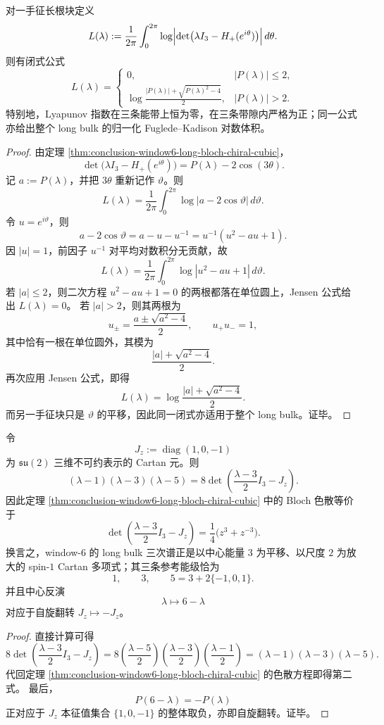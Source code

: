 \begin{theorem}\label{thm:conclusion-window6-long-bloch-lyapunov-fk}
对一手征长根块定义
\[
L(\lambda):=
\frac{1}{2\pi}
\int_0^{2\pi}
\log\Bigl|\det\bigl(\lambda I_3-H_+(e^{i\theta})\bigr)\Bigr|\,d\theta.
\]
则有闭式公式
\[
L(\lambda)=
\begin{cases}
0, & |P(\lambda)|\le 2,\\[2mm]
\displaystyle
\log\frac{|P(\lambda)|+\sqrt{P(\lambda)^2-4}}{2},
& |P(\lambda)|>2.
\end{cases}
\]
特别地，Lyapunov 指数在三条能带上恒为零，在三条带隙内严格为正；同一公式亦给出整个 long bulk 的归一化 Fuglede--Kadison 对数体积。
\end{theorem}
\begin{proof}
由定理 \ref{thm:conclusion-window6-long-bloch-chiral-cubic}，
\[
\det\bigl(\lambda I_3-H_+(e^{i\theta})\bigr)=P(\lambda)-2\cos(3\theta).
\]
记 \(a:=P(\lambda)\)，并把 \(3\theta\) 重新记作 \(\vartheta\)。则
\[
L(\lambda)=\frac1{2\pi}\int_0^{2\pi}\log|a-2\cos\vartheta|\,d\vartheta.
\]
令 \(u=e^{i\vartheta}\)，则
\[
a-2\cos\vartheta=a-u-u^{-1}=u^{-1}(u^2-au+1).
\]
因 \(|u|=1\)，前因子 \(u^{-1}\) 对平均对数积分无贡献，故
\[
L(\lambda)=\frac1{2\pi}\int_0^{2\pi}\log|u^2-au+1|\,d\vartheta.
\]
若 \(|a|\le 2\)，则二次方程 \(u^2-au+1=0\) 的两根都落在单位圆上，Jensen 公式给出 \(L(\lambda)=0\)。
若 \(|a|>2\)，则其两根为
\[
u_{\pm}=\frac{a\pm \sqrt{a^2-4}}{2},
\qquad
u_+u_-=1,
\]
其中恰有一根在单位圆外，其模为
\[
\frac{|a|+\sqrt{a^2-4}}{2}.
\]
再次应用 Jensen 公式，即得
\[
L(\lambda)=\log\frac{|a|+\sqrt{a^2-4}}{2}.
\]
而另一手征块只是 \(\vartheta\) 的平移，因此同一闭式亦适用于整个 long bulk。证毕。
\end{proof}

\begin{proposition}\label{prop:conclusion-window6-spin1-cartan-shadow}
令
\[
J_z:=\operatorname{diag}(1,0,-1)
\]
为 \(\mathfrak{su}(2)\) 三维不可约表示的 Cartan 元。则
\[
(\lambda-1)(\lambda-3)(\lambda-5)
=
8\det\!\left(\frac{\lambda-3}{2}I_3-J_z\right).
\]
因此定理 \ref{thm:conclusion-window6-long-bloch-chiral-cubic} 中的 Bloch 色散等价于
\[
\det\!\left(\frac{\lambda-3}{2}I_3-J_z\right)
=
\frac14\bigl(z^3+z^{-3}\bigr).
\]
换言之，window-\(6\) 的 long bulk 三次谱正是以中心能量 \(3\) 为平移、以尺度 \(2\) 为放大的 spin-\(1\) Cartan 多项式；其三条参考能级恰为
\[
1,\qquad 3,\qquad 5=3+2\{-1,0,1\}.
\]
并且中心反演
\[
\lambda\longmapsto 6-\lambda
\]
对应于自旋翻转 \(J_z\mapsto -J_z\)。
\end{proposition}
\begin{proof}
直接计算可得
\[
8\det\!\left(\frac{\lambda-3}{2}I_3-J_z\right)
=
8\left(\frac{\lambda-5}{2}\right)\left(\frac{\lambda-3}{2}\right)\left(\frac{\lambda-1}{2}\right)
=(\lambda-1)(\lambda-3)(\lambda-5).
\]
代回定理 \ref{thm:conclusion-window6-long-bloch-chiral-cubic} 的色散方程即得第二式。
最后，
\[
P(6-\lambda)=-P(\lambda)
\]
正对应于 \(J_z\) 本征值集合 \(\{1,0,-1\}\) 的整体取负，亦即自旋翻转。证毕。
\end{proof}

